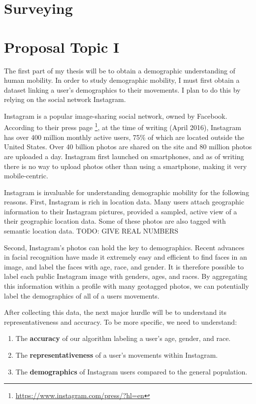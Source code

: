 \documentclass[12pt]{article}
\begin{document}
\section{Surveying}
\label{sec:survey}



\section{Proposal Topic I}
\label{ch:proposal}
The first part of my thesis will be to obtain a demographic understanding of human mobility.
In order to study demographic mobility, I must first obtain a dataset linking a user's demographics to their movements.
I plan to do this by relying on the social network Instagram.

Instagram is a popular image-sharing social network, owned by Facebook.
According to their press page \footnote{\url{https://www.instagram.com/press/?hl=en}}, at the time of writing (April 2016), Instagram has over 400 million monthly active users, 75\% of which are located outside the United States.
Over 40 billion photos are shared on the site and 80 million photos are uploaded a day.
Instagram first launched on smartphones, and as of writing there is no way to upload photos other than using a smartphone, making it very mobile-centric.

Instagram is invaluable for understanding demographic mobility for the following reasons.
First, Instagram is rich in location data.
Many users attach geographic information to their Instagram pictures, provided a sampled, active view of a their geographic location data.
Some of these photos are also tagged with semantic location data.
TODO: GIVE REAL NUMBERS

Second, Instagram's photos can hold the key to demographics.
Recent advances in facial recognition have made it extremely easy and efficient to find faces in an image, and label the faces with age, race, and gender.
It is therefore possible to label each public Instagram image with genders, ages, and races.
By aggregating this information within a profile with many geotagged photos, we can potentially label the demographics of all of a users movements.

After collecting this data, the next major hurdle will be to understand its representativeness and accuracy.
To be more specific, we need to understand:
\begin{enumerate}
  \item The \textbf{accuracy} of our algorithm labeling a user's age, gender, and race.
  \item The \textbf{representativeness} of a user's movements within Instagram. 
  \item The \textbf{demographics} of Instagram users compared to the general population.
\end{enumerate}
\end{document}
